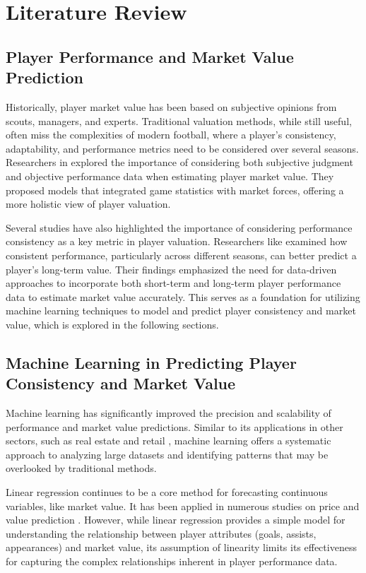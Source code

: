 \documentclass[12pt, a4paper,oneside]{book}
\numberwithin{equation}{section}
\begin{document}
\chapter{Literature Review}\label{ch:2}
\section{Player Performance and Market Value Prediction}\label{sec:2.1}
Historically, player market value has been based on subjective opinions from scouts, managers, and experts. Traditional valuation methods, while still useful, often miss the complexities of modern football, where a player's consistency, adaptability, and performance metrics need to be considered over several seasons. Researchers in \cite{muller2012} explored the importance of considering both subjective judgment and objective performance data when estimating player market value. They proposed models that integrated game statistics with market forces, offering a more holistic view of player valuation.

Several studies have also highlighted the importance of considering performance consistency as a key metric in player valuation. Researchers like \cite{kalman2016} examined how consistent performance, particularly across different seasons, can better predict a player’s long-term value. Their findings emphasized the need for data-driven approaches to incorporate both short-term and long-term player performance data to estimate market value accurately. This serves as a foundation for utilizing machine learning techniques to model and predict player consistency and market value, which is explored in the following sections.

\section{Machine Learning in Predicting Player Consistency and Market Value}\label{sec:2.2}

Machine learning has significantly improved the precision and scalability of performance and market value predictions. Similar to its applications in other sectors, such as real estate and retail \cite{montgomeryj2012}, machine learning offers a systematic approach to analyzing large datasets and identifying patterns that may be overlooked by traditional methods.

Linear regression continues to be a core method for forecasting continuous variables, like market value. It has been applied in numerous studies on price and value prediction \cite{montgomeryj2012}. However, while linear regression provides a simple model for understanding the relationship between player attributes (goals, assists, appearances) and market value, its assumption of linearity limits its effectiveness for capturing the complex relationships inherent in player performance data.
\end{document}
